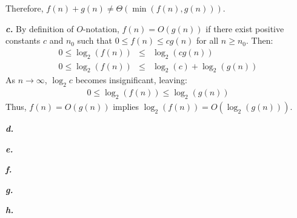 \documentclass{article}
\begin{document}
Therefore, $f(n) + g(n) \neq \Theta(\min(f(n),g(n)))$.

\noindent\textbf{\textit{c.}} By definition of $O$-notation,  $f(n) = O(g(n))$ if there exist positive constants $c$ and $n_0$ such that $0 \leq f(n) \leq c g(n)$ for all $n \geq n_0$. Then:
\begin{eqnarray*}
	0 \leq \log_2(f(n)) & \leq & \log_2(c g(n)) \\
	0 \leq \log_2(f(n)) & \leq & \log_2(c) + \log_2(g(n))
\end{eqnarray*}
As $n \rightarrow \infty$, $\log_2 c$ becomes insignificant, leaving:
\begin{eqnarray*}
	0 \leq \log_2(f(n)) \leq \log_2(g(n))
\end{eqnarray*}
Thus, $f(n) = O(g(n))$ implies $\log_2(f(n)) = O(\log_2(g(n)))$.

\noindent\textbf{\textit{d.}}

\noindent\textbf{\textit{e.}}

\noindent\textbf{\textit{f.}}

\noindent\textbf{\textit{g.}}

\noindent\textbf{\textit{h.}}
\end{document}
